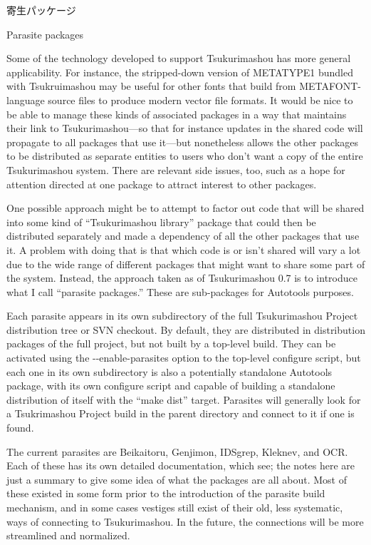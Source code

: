 \documentclass[14pt]{extarticle}
\newcommand{\blsubsection}[2]{%
\kaku\large#1\qquad\phantomsection%
\addcontentsline{toc}{subsection}{#1 #2}%
#2\par\addpenalty{-300}\normalsize}
\begin{document}

\blsubsection{寄生パッケージ}{Parasite packages}\label{sub:parasites}

Some of the technology developed to support Tsukurimashou has more general
applicability.  For instance, the stripped-down version of METATYPE1 bundled
with Tsukruimashou may be useful for other fonts that build from
METAFONT-language source files to produce modern vector file formats.  It
would be nice to be able to manage these kinds of associated packages in a
way that maintains their link to Tsukurimashou---so that for instance
updates in the shared code will propagate to all packages that use it---but
nonetheless allows the other packages to be distributed as separate entities
to users who don't want a copy of the entire Tsukurimashou system.  There
are relevant side issues, too, such as a hope for attention directed at one
package to attract interest to other packages.

One possible approach might be to attempt to factor out code that will be
shared into some kind of ``Tsukurimashou library'' package that could then
be distributed separately and made a dependency of all the other packages
that use it.  A problem with doing that is that which code is or isn't
shared will vary a lot due to the wide range of different packages that
might want to share some part of the system.  Instead, the approach taken as
of Tsukurimashou 0.7 is to introduce what I call ``parasite packages.''
These are sub-packages for Autotools purposes.

Each parasite appears in its own subdirectory of the full Tsukurimashou
Project distribution tree or SVN checkout.  By default, they are distributed
in distribution packages of the full project, but not built by a top-level
build.  They can be activated using the -{}-enable-parasites option to the
top-level configure script, but each one in its own subdirectory is also a
potentially standalone Autotools package, with its own configure script and
capable of building a standalone distribution of itself with the ``make
dist'' target.  Parasites will generally look for a Tsukrimashou Project
build in the parent directory and connect to it if one is found.

The current parasites are Beikaitoru, Genjimon, IDSgrep, Kleknev, and OCR. 
Each of these has its own detailed documentation, which see; the notes here
are just a summary to give some idea of what the packages are all about. 
Most of these existed in some form prior to the introduction of the parasite
build mechanism, and in some cases vestiges still exist of their old, less
systematic, ways of connecting to Tsukurimashou.  In the future, the
connections will be more streamlined and normalized.
\end{document}
